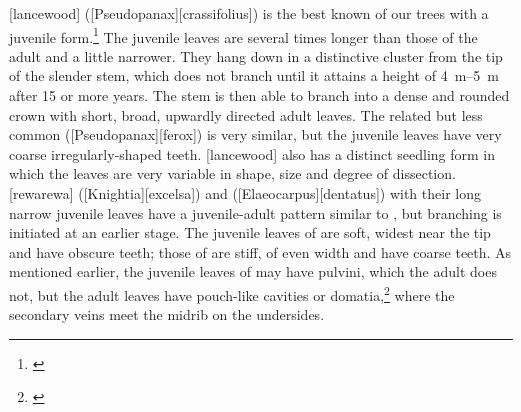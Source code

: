 [lancewood] ([Pseudopanax][crassifolius]) is the best known of our trees with a juvenile form.\footnote{\cite{laing1906plants}}
The juvenile leaves are several times longer than those of the adult and a little narrower.
They hang down in a distinctive cluster from the tip of the slender stem, which does not branch until it attains a height of \SIrange{4}{5}{\metre} after 15 or more years.
The stem is then able to branch into a dense and rounded crown with short, broad, upwardly directed adult leaves.
The related but less common  ([Pseudopanax][ferox]) is very similar, but the juvenile leaves have very coarse irregularly-shaped teeth.
[lancewood] also has a distinct seedling form in which the leaves are very variable in shape, size and degree of dissection.
[rewarewa] ([Knightia][excelsa]) and  ([Elaeocarpus][dentatus]) with their long narrow juvenile leaves have a juvenile-adult pattern similar to , but branching is initiated at an earlier stage.
The juvenile leaves of  are soft, widest near the tip and have obscure teeth; those of  are stiff, of even width and have coarse teeth.
As mentioned earlier, the juvenile leaves of  may have pulvini, which the adult does not, but the adult leaves have pouch-like cavities or domatia,\footnote{\cite{sampson1965domatia}} where the secondary veins meet the midrib on the undersides.


